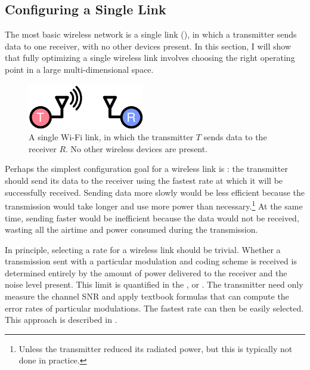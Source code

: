\subsection{Configuring a Single Link}
\label{sec:intro_single_link_problems}
The most basic wireless network is a single link (), in which a transmitter sends data to one receiver, with no other devices present. In this section, I will show that fully optimizing a single wireless link involves choosing the right operating point in a large multi-dimensional space. 

\begin{figure}[tp]
	\centering
	\includegraphics[width=2in]{figures/single_link_circle}
	\caption[A single Wi-Fi link]{\label{fig:wifi_link}A single Wi-Fi link, in which the transmitter $T$ sends data to the receiver $R$. No other wireless devices are present.}
\end{figure}

Perhaps the simplest configuration goal for a wireless link is : the transmitter should send its data to the receiver using the fastest rate at which it will be successfully received. Sending data more slowly would be less efficient because the transmission would take longer and use more power than necessary.\footnote{Unless the transmitter reduced its radiated power, but this is typically not done in practice.} At the same time, sending faster would be inefficient because the data would not be received, wasting all the airtime and power consumed during the transmission.

In principle, selecting a rate for a wireless link should be trivial. Whether a transmission sent with a particular modulation and coding scheme is received
is determined entirely by the amount of power delivered to the receiver and the noise level present. This limit is quantified in the , or .
The transmitter need only measure the channel SNR and apply textbook formulas that can compute the error rates of particular modulations. The fastest rate can then be easily selected. This approach is described in .

